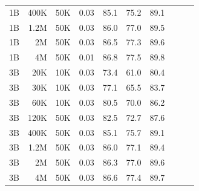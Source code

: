 \begin{table}[h]
\begin{tabulary}{1.0\textwidth}{l r c c c c c c c c}
1B    & 400K  & 50K   & 0.03 & 85.1 & 75.2 & 89.1 \\
1B    & 1.2M  & 50K   & 0.03 & 86.0 & 77.0 & 89.5 \\
1B    & 2M    & 50K   & 0.03 & 86.5 & 77.3 & 89.6 \\
1B    & 4M    & 50K   & 0.01 & 86.8 & 77.5 & 89.8 \\
\midrule[0.25pt]
3B    & 20K   & 10K   & 0.03 & 73.4 & 61.0 & 80.4 \\
3B    & 30K   & 10K   & 0.03 & 77.1 & 65.5 & 83.7 \\
3B    & 60K   & 10K   & 0.03 & 80.5 & 70.0 & 86.2 \\
3B    & 120K  & 50K   & 0.03 & 82.5 & 72.7 & 87.6 \\
3B    & 400K  & 50K   & 0.03 & 85.1 & 75.7 & 89.1 \\
3B    & 1.2M  & 50K   & 0.03 & 86.0 & 77.1 & 89.4 \\
3B    & 2M    & 50K   & 0.03 & 86.3 & 77.0 & 89.6 \\
3B    & 4M    & 50K   & 0.03 & 86.6 & 77.4 & 89.7 \\
    \bottomrule
  \end{tabulary}
\end{table}

